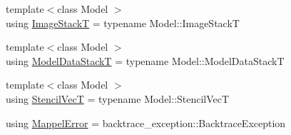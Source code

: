 \begin{DoxyCompactItemize}
\item 
{\footnotesize template$<$class Model $>$ }\\using \hyperlink{namespacemappel_a636dbe5b195c267a5f6a65cd48ff94a6}{Image\+StackT} = typename Model\+::\+Image\+StackT
\item 
{\footnotesize template$<$class Model $>$ }\\using \hyperlink{namespacemappel_aaeb6665bc57476dd93c2df6ad8bc4768}{Model\+Data\+StackT} = typename Model\+::\+Model\+Data\+StackT
\item 
{\footnotesize template$<$class Model $>$ }\\using \hyperlink{namespacemappel_a62f73447ef1973cca188b1b801864f7e}{Stencil\+VecT} = typename Model\+::\+Stencil\+VecT
\item 
using \hyperlink{namespacemappel_a9a55f6aee1523ba336066874a36dc29c}{Mappel\+Error} = backtrace\+\_\+exception\+::\+Backtrace\+Exception
\end{DoxyCompactItemize}
